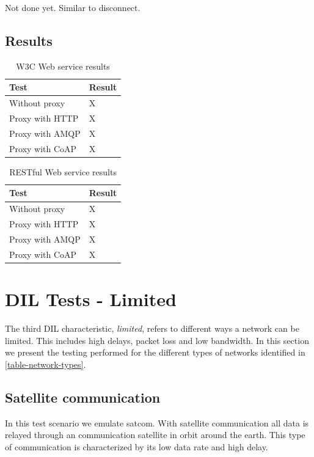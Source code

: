 Not done yet. Similar to disconnect.

\subsection{Results}

\begin{table}[H]
\begin{tabular}{| l | l |}
\hline
  \textbf{Test} & \textbf{Result} \\ \hline
  Without proxy & X \\ \hline
  Proxy with HTTP & X \\ \hline
  Proxy with AMQP & X \\ \hline
  Proxy with CoAP & X \\ \hline
\end{tabular}
\caption{W3C Web service results}
\end{table}

\begin{table}[H]
\begin{tabular}{| l | l |}
\hline
  \textbf{Test} & \textbf{Result} \\ \hline
  Without proxy & X \\ \hline
  Proxy with HTTP & X \\ \hline
  Proxy with AMQP & X \\ \hline
  Proxy with CoAP & X \\ \hline
\end{tabular}
\caption{RESTful Web service results}
\end{table}

\section{DIL Tests - Limited}

The third DIL characteristic, \textit{limited}, refers to different ways a
network can be limited. This includes high delays, packet loss and low
bandwidth. In this section we present the testing performed for the different
types of networks identified in \cref{table-network-types}.



\subsection{Satellite communication}

In this test scenario we emulate \gls{satcom}. With satellite communication
all data is relayed through an communication satellite in orbit around
the earth. This type of communication is characterized by its low data rate
and high delay.

